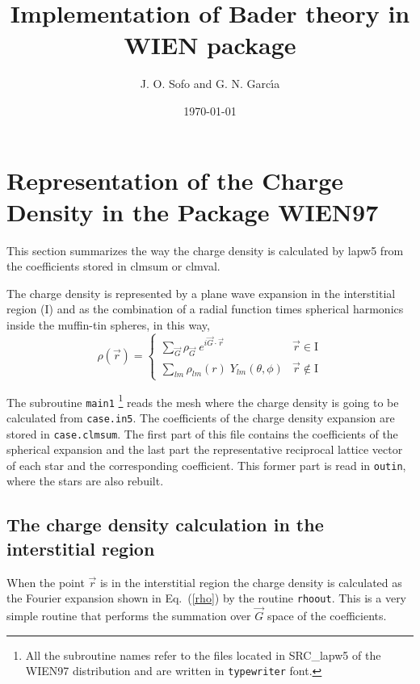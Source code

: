 \documentclass{article}
\begin{document}
\title{Implementation of Bader theory in WIEN package}
\author{J. O. Sofo and G. N. Garc\'{\i}a}
\date{\today}
\maketitle

\section{Representation of the Charge Density in the Package WIEN97}

This section summarizes the way the charge density is calculated by
lapw5 from the coefficients stored in clmsum or clmval.

The charge density is represented by a plane wave expansion in the
interstitial region (I) and as the combination of a radial function
times spherical harmonics inside the muffin-tin spheres, in this way,
\begin{equation}
\rho(\vec{r})=\left\{
\begin{array}{ll}
\displaystyle \sum_{\vec{G}} \rho_{\vec{G}}\;
e^{i\vec{G}\cdot\vec{r}} & \vec{r} \in \mbox{I}\\
\displaystyle \sum_{lm} \rho_{lm}(r)\;Y_{lm}(\theta,\phi) &
\vec{r}\notin \mbox{I}
\end{array}
\right.
\label{rho}
\end{equation}


The subroutine \texttt{main1}
\footnote{All the subroutine names refer to the files located in
SRC\_lapw5 of the WIEN97 distribution and are written in
\texttt{typewriter} font.}
reads the mesh where the charge density is going to be calculated from
\texttt{case.in5}. 
The coefficients of the charge density expansion are stored in
\texttt{case.clmsum}. The first part of this file contains the coefficients
of the spherical expansion and the last part the representative
reciprocal lattice vector of each star and the corresponding
coefficient. This former part is read in \texttt{outin}, where the
stars are also rebuilt.


\subsection{The charge density calculation in the
interstitial region}

When the point $\vec{r}$ is in the interstitial region the charge
density is calculated as the Fourier expansion shown in
Eq.~(\ref{rho}) by the routine \texttt{rhoout}. This is a very simple
routine that performs the summation over $\vec{G}$ space of the
coefficients.
\end{document}
